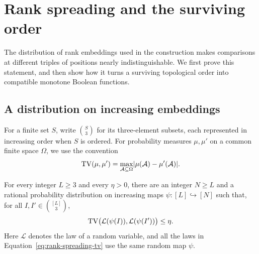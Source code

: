 \section{Rank spreading and the surviving order}
\label{sec:ranks}

The distribution of rank embeddings used in the construction makes comparisons
at different triples of positions nearly indistinguishable.  We first prove
this statement, and then show how it turns a surviving topological order into
compatible monotone Boolean functions.

\subsection{A distribution on increasing embeddings}

For a finite set $S$, write $\binom{S}{3}$ for its three-element subsets,
each represented in increasing order when $S$ is ordered.  For probability
measures $\mu,\mu'$ on a common finite space $\Omega$, we use the convention
\[
  \operatorname{TV}(\mu,\mu')=\max_{\mathcal A\subseteq\Omega}
     \lvert\mu(\mathcal A)-\mu'(\mathcal A)\rvert.
\]

\begin{lemma}
\label{lem:rank-spreading}
For every integer $L\ge3$ and every $\eta>0$, there are an integer $N\ge L$
and a rational probability distribution on increasing maps
$\psi\colon[L]\hookrightarrow[N]$ such that, for all
$I,I'\in\binom{[L]}{3}$,
\begin{equation}
\label{eq:rank-spreading-tv}
  \operatorname{TV}\bigl(\mathcal L(\psi(I)),\mathcal L(\psi(I'))\bigr)\le\eta.
\end{equation}
Here $\mathcal L$ denotes the law of a random variable, and all the laws in
Equation~\eqref{eq:rank-spreading-tv} use the same random map $\psi$.
\end{lemma}

